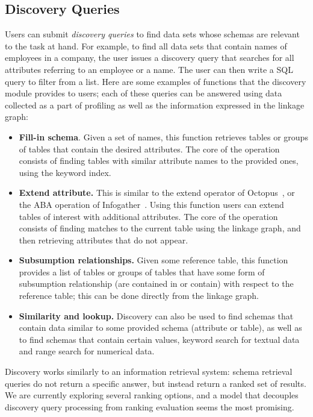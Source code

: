 \subsection{Discovery Queries}
\label{subsec:api}

Users can submit
\emph{discovery queries} to find data sets whose schemas are relevant to the
task at hand. For example, to find all data sets that contain names of employees
in a company, the user issues a discovery query that searches for all attributes
referring to an employee or a name. The user can then write a SQL query to filter
from a list. Here are some examples of functions that the discovery module
provides to users;  each of these queries can be answered using data collected
as a part of profiling as well as the information expressed in the
linkage graph:

\begin{itemize}
\item \textbf{Fill-in schema}. Given a set of names, this function retrieves 
tables or groups of tables that contain the desired attributes. The core
of the operation consists of finding tables with similar attribute names to the
provided ones, using the keyword index.


\item \textbf{Extend attribute.} This is similar to the extend operator of
Octopus~\cite{DBLP:journals/pvldb/CafarellaHK09}, or the ABA operation of
Infogather~\cite{DBLP:conf/sigmod/YakoutGCC12}. Using this function users can
extend tables of interest with additional attributes. The core of the operation
consists of finding matches to the current table using the linkage graph, and then retrieving 
attributes that do not appear.

\item \textbf{Subsumption relationships.} Given some reference table, this
function provides a list of tables or groups of tables that have some form of
subsumption relationship (\ie are contained in or contain) with respect to the
reference table;  this can be done directly from the linkage graph.


\item \textbf{Similarity and lookup.} Discovery can also be used to find schemas
that contain data similar to some provided schema (attribute or table), as well
as to find schemas that contain certain values, \ie keyword search for textual
data and range search for numerical data.  


\end{itemize}

Discovery works similarly to an information retrieval system: schema retrieval queries
do not return a specific answer, but instead return a ranked set of results. We
are currently exploring several ranking options, and a model that decouples
discovery query processing from ranking evaluation seems the most promising.


